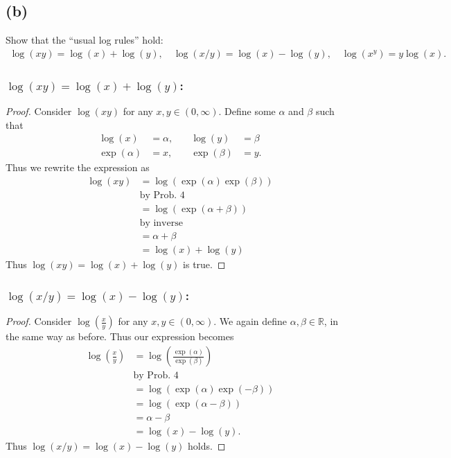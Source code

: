 \documentclass[12pt]{amsart}
\newcommand{\prob}[1]{Prob. #1}
\newcommand{\R}{\mathbb{R}}
\begin{document}
  \subsection*{(b)}%
  \label{sub:_b_}

  Show that the ``usual log rules'' hold:
  \begin{align*}
    \log(xy)=\log(x)+\log(y),\quad
    \log(x/y)=\log(x)-\log(y),\quad
    \log(x^y)=y\log(x).
  \end{align*}

  \subsubsection*{$\log(xy)=\log(x)+\log(y)$:}%
  \label{ssub:_log_xy_log_x_log_y_}

  \begin{proof}
    Consider $\log(xy)$ for any $x,y\in(0,\infty)$. Define some $\alpha$ and
    $\beta$ such that
    \begin{align*}
      \log(x)&=\alpha,\quad&\log(y)&=\beta\\
      \exp(\alpha)&=x,\quad&\exp(\beta)&=y.
    \end{align*}
    Thus we rewrite the expression as
    \begin{align*}
      \log(xy)&=\log(\exp(\alpha)\exp(\beta))\\
              &\text{by \prob{4}}\\
              &=\log(\exp(\alpha+\beta))\\
              &\text{by inverse}\\
              &=\alpha+\beta\\
              &=\log(x)+\log(y)
    \end{align*}
    Thus $\log(xy)=\log(x)+\log(y)$ is true.
  \end{proof}

  \subsubsection*{$\log(x/y)=\log(x)-\log(y)$:}%
  \label{ssub:_log_x_y_log_x_log_y_}

  \begin{proof}
    Consider $\log\left(\frac{x}{y}\right)$ for any $x,y\in(0,\infty)$. We again
    define $\alpha,\beta\in\R$, in the same way as before. Thus our expression
    becomes
    \begin{align*}
      \log\left(\frac{x}{y}\right)&=\log\left(\frac{\exp(\alpha)}{\exp(\beta)}\right)\\
                                  &\text{by \prob{4}}\\
                                  &=\log(\exp(\alpha)\exp(-\beta))\\
                                  &=\log(\exp(\alpha-\beta))\\
                                  &=\alpha-\beta\\
                                  &=\log(x)-\log(y).
    \end{align*}
    Thus $\log(x/y)=\log(x)-\log(y)$ holds.
  \end{proof}
\end{document}
